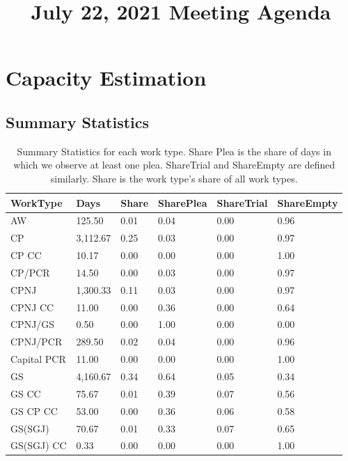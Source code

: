 \documentclass[11pt]{article}
\title{July 22, 2021 Meeting Agenda}
\begin{document}
\maketitle

\section{Capacity Estimation}
  \subsection{Summary Statistics}
    \begin{table}[H]
      \centering
      \caption{Summary Statistics for each work type. Share Plea is the share of days in which we observe at least one plea. ShareTrial and ShareEmpty are defined similarly. Share is the work type's share of all work types.}
      \label{tab:my-table}
      \begin{tabular}{|l|l|l|l|l|l|}
      \hline
      \textbf{WorkType} & \textbf{Days} & \textbf{Share} & \textbf{SharePlea} & \textbf{ShareTrial} & \textbf{ShareEmpty} \\ \hline
      AW          & 125.50   & 0.01 & 0.04 & 0.00 & 0.96 \\ \hline
      CP          & 3,112.67 & 0.25 & 0.03 & 0.00 & 0.97 \\ \hline
      CP CC       & 10.17    & 0.00 & 0.00 & 0.00 & 1.00 \\ \hline
      CP/PCR      & 14.50    & 0.00 & 0.03 & 0.00 & 0.97 \\ \hline
      CPNJ        & 1,300.33 & 0.11 & 0.03 & 0.00 & 0.97 \\ \hline
      CPNJ CC     & 11.00    & 0.00 & 0.36 & 0.00 & 0.64 \\ \hline
      CPNJ/GS     & 0.50     & 0.00 & 1.00 & 0.00 & 0.00 \\ \hline
      CPNJ/PCR    & 289.50   & 0.02 & 0.04 & 0.00 & 0.96 \\ \hline
      Capital PCR & 11.00    & 0.00 & 0.00 & 0.00 & 1.00 \\ \hline
      GS          & 4,160.67 & 0.34 & 0.64 & 0.05 & 0.34 \\ \hline
      GS CC       & 75.67    & 0.01 & 0.39 & 0.07 & 0.56 \\ \hline
      GS CP CC    & 53.00    & 0.00 & 0.36 & 0.06 & 0.58 \\ \hline
      GS(SGJ)     & 70.67    & 0.01 & 0.33 & 0.07 & 0.65 \\ \hline
      GS(SGJ) CC  & 0.33     & 0.00 & 0.00 & 0.00 & 1.00 \\ \hline

\end{tabular}
\end{table}
\end{document}
